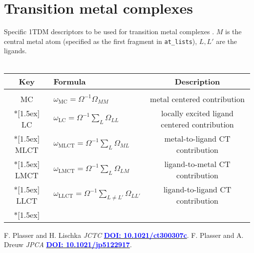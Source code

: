 \documentclass[12pt,a4paper]{article}
\newcommand{\om}[1]{\omega_{\textrm{#1}}}
\newcommand{\doi}[1]{\href{http://dx.doi.org/#1}{\textcolor{blue}{\bf DOI: #1}}}
\begin{document}
\section{Transition metal complexes}
Specific 1TDM descriptors to be used for transition metal complexes \cite{Ircomp}.
$M$ is the central metal atom (specified as the first fragment in \texttt{at\_lists}), $L,L'$ are the ligands.
\\~\\
\begin{tabular}{clc}
\hline 
\textbf{Key} & \textbf{Formula} & \textbf{Description} \\ 
\hline
\\
MC & $\om{MC}=\Omega^{-1}\Omega_{MM}$ & metal centered contribution \\*[1.5ex]
LC & $\om{LC}=\Omega^{-1}\sum_L\Omega_{LL}$ & locally excited ligand centered contribution \\*[1.5ex]
MLCT & $\om{MLCT}=\Omega^{-1}\sum_L\Omega_{ML}$ & metal-to-ligand CT contribution \\*[1.5ex]
LMCT & $\om{LMCT}=\Omega^{-1}\sum_L\Omega_{LM}$ & ligand-to-metal CT contribution\\*[1.5ex]
LLCT & $\om{LLCT}=\Omega^{-1}\sum_{L\neq L'}\Omega_{LL'}$ & ligand-to-ligand CT contribution\\*[1.5ex]
\hline 
\end{tabular}

\begin{thebibliography}{9}
 F. Plasser and H. Lischka \textit{JCTC} \doi{10.1021/ct300307c}.
 F. Plasser and A. Dreuw \textit{JPCA} \doi{10.1021/jp5122917}.
\end{thebibliography}
\end{document}
